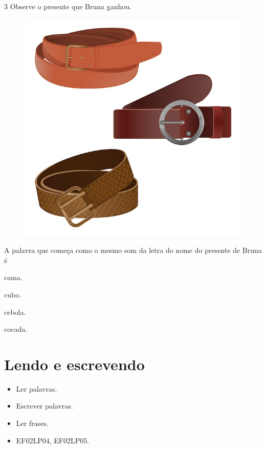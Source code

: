 \num{3} Observe o presente que Bruna ganhou.

\begin{figure}[htpb!]
\centering
\includegraphics[width=.3\textwidth]{media/image48.jpeg}
\end{figure}

A palavra que começa como o mesmo som da letra do nome do presente de Bruna é

\begin{multicols}{2}
\begin{escolha}
\item cama.

\item cubo.

\item cebola.

\item cocada.
\end{escolha}
\end{multicols}

\chapter{Lendo e escrevendo}

\vspace*{-1.5cm}


\begin{itemize}
\item Ler palavras.
\item Escrever palavras.
\item Ler frases.
\end{itemize}


\begin{itemize}
\item EF02LP04, EF02LP05.
\end{itemize}

